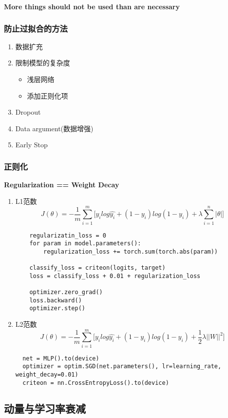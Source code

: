 \textbf{More things should not be used than are necessary}

\subsubsection{防止过拟合的方法}
\begin{enumerate}
  \item 数据扩充
  \item 限制模型的复杂度
  \begin{itemize}
    \item 浅层网络
    \item 添加正则化项
  \end{itemize}
  \item Dropout
  \item Data argument(数据增强)
  \item Early Stop
\end{enumerate}



\subsubsection{正则化}
\textbf{Regularization == Weight Decay}
\begin{enumerate}
  \item L1范数
  $$J(\theta)=-\frac{1}{m}\sum_{i=1}^{m}\big[y_ilog\hat{y_i}+(1-y_i)log(1-y_i)+\lambda\sum_{i=1}^{n}|\theta|\big]$$
  \begin{lstlisting}
    regularizatin_loss = 0
    for param in model.parameters():
        regularization_loss += torch.sum(torch.abs(param))

    classify_loss = criteon(logits, target)
    loss = classify_loss + 0.01 + regularization_loss

    optimizer.zero_grad()
    loss.backward()
    optimizer.step()
  \end{lstlisting}
  \item L2范数
  $$J(\theta)=-\frac{1}{m}\sum_{i=1}^{m}\big[y_ilog\hat{y_i}+(1-y_i)log(1-y_i)+\frac{1}{2}\lambda||W||^2\big]$$
  \begin{lstlisting}
  net = MLP().to(device)
  optimizer = optim.SGD(net.parameters(), lr=learning_rate, weight_decay=0.01)
  criteon = nn.CrossEntropyLoss().to(device)
  \end{lstlisting}
\end{enumerate}



\subsection{动量与学习率衰减}

